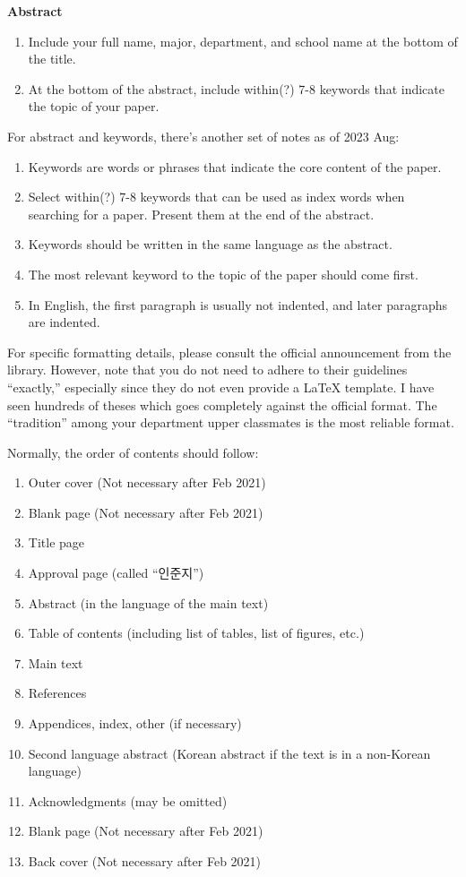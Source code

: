 \documentclass[12pt]{report}
\makeatletter
\renewcommand{\abstractname}{\large Abstract}
\renewenvironment{abstract}{%
    \if@twocolumn
    \section*{\abstractname}%
    \else
    \small
    \begin{center}%
        {\bfseries \abstractname\vspace{-.5em}\vspace{\z@}}%
    \end{center}%
    \quotation
    \fi}
{\if@twocolumn\else\endquotation\fi}
\renewenvironment{abstract}
 {\small
  \begin{center}
  \bfseries \abstractname\vspace{-.5em}\vspace{0pt}
  \end{center}
  \list{}{%
    \setlength{\leftmargin}{10mm}%
    \setlength{\rightmargin}{\leftmargin}%
  }%
  \item\relax}
 {\endlist}
\makeatother
\begin{document}
\begin{abstract}
\begin{enumerate}[itemsep=0pt, topsep=0pt, partopsep=0pt]
\item Include your full name, major, department, and school name at the bottom of the title.
\item At the bottom of the abstract, include within(?) 7-8 keywords that indicate the topic of your paper.
\end{enumerate}
For abstract and keywords, there's another set of notes as of 2023 Aug:
\begin{enumerate}[itemsep=0pt, topsep=0pt, partopsep=0pt]
\item Keywords are words or phrases that indicate the core content of the paper.
\item Select within(?) 7-8 keywords that can be used as index words when searching for a paper. Present them at the end of the abstract.
\item Keywords should be written in the same language as the abstract.
\item The most relevant keyword to the topic of the paper should come first.
\item In English, the first paragraph is usually not indented, and later paragraphs are indented.
\end{enumerate}
For specific formatting details, please consult the official announcement from the library. However, note that you do not need to adhere to their guidelines ``exactly,'' especially since they do not even provide a LaTeX template. I have seen hundreds of theses which goes completely against the official format. The ``tradition'' among your department upper classmates is the most reliable format.

\quad Normally, the order of contents should follow:
\begin{enumerate}[itemsep=0pt, topsep=0pt, partopsep=0pt]
\item Outer cover (Not necessary after Feb 2021)
\item Blank page (Not necessary after Feb 2021)
\item Title page
\item Approval page (called ``인준지'')
\item Abstract (in the language of the main text)
\item Table of contents (including list of tables, list of figures, etc.)
\item Main text
\item References
\item Appendices, index, other (if necessary)
\item Second language abstract (Korean abstract if the text is in a non-Korean language)
\item Acknowledgments (may be omitted)
\item Blank page (Not necessary after Feb 2021)
\item Back cover (Not necessary after Feb 2021)
\end{enumerate}


\end{abstract}
\end{document}
